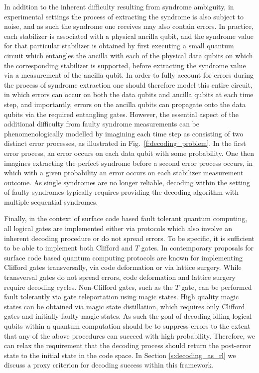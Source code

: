 \documentclass[twocolumn,preprintnumbers,amsmath,amssymb,notitlepage,nofootinbib,longbibliography,superscriptaddress,aps,pra,10pt]{revtex4-1}
\begin{document}
    In addition to the inherent difficulty resulting from syndrome ambiguity, in experimental settings the process of extracting the syndrome is also subject to noise, and as such the syndrome one receives may also contain errors.
    In practice, each stabilizer is associated with a physical ancilla qubit, and the syndrome value for that particular stabilizer is obtained by first executing a small quantum circuit which entangles the ancilla with each of the physical data qubits on which the corresponding stabilizer is supported, before extracting the syndrome value via a measurement of the ancilla qubit.
    In order to fully account for errors during the process of syndrome extraction one should therefore model this entire circuit, in which errors can occur on both the data qubits and ancilla qubits at each time step, and importantly, errors on the ancilla qubits can propagate onto the data qubits via the required entangling gates.
    However, the essential aspect of the additional difficulty from faulty syndrome measurements can be phenomenologically modelled by imagining each time step as consisting of two distinct error processes, as illustrated in Fig.~\ref{f:decoding_problem}.
    In the first error process, an error occurs on each data qubit with some probability.
    One then imagines extracting the perfect syndrome before a second error process occurs, in which with a given probability an error occurs on each stabilizer measurement outcome.
    As single syndromes are no longer reliable, decoding within the setting of faulty syndromes typically requires providing the decoding algorithm with multiple sequential syndromes.

    Finally, in the context of surface code based fault tolerant quantum computing, all logical gates are implemented either via protocols which also involve an inherent decoding procedure or do not spread errors. 
    To be specific, it is sufficient to be able to implement both Clifford and $T$ gates.
    In contemporary proposals for surface code based quantum computing protocols are known for implementing Clifford gates transversally, via code deformation or via lattice surgery.
    While transversal gates do not spread errors, code deformation and lattice surgery require decoding cycles.
    Non-Clifford gates, such as the $T$ gate, can be performed fault tolerantly via gate teleportation using magic states. 
    High quality magic states can be obtained via magic state distillation, which requires only Clifford gates and initially faulty magic states.
    As such the goal of decoding idling logical qubits within a quantum computation should be to suppress errors to the extent that any of the above procedures can succeed with high probability.
    Therefore, we can relax the requirement that the decoding process should return the post-error state to the initial state in the code space.
    In Section \ref{s:decoding_as_rl} we discuss a proxy criterion for decoding success within this framework.
\end{document}

